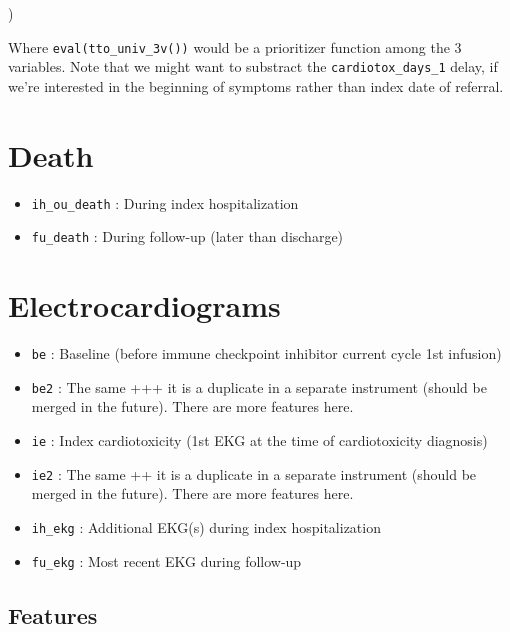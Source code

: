 \documentclass[
]{book}
\newenvironment{Shaded}{\begin{snugshade}}{\end{snugshade}}
\newcommand{\NormalTok}[1]{#1}
\begin{document}
\begin{Shaded}
\begin{Highlighting}[]
\NormalTok{  )}
\end{Highlighting}
\end{Shaded}

Where \texttt{eval(tto\_univ\_3v())} would be a prioritizer function among the 3 variables. Note that we might want to substract the \texttt{cardiotox\_days\_1} delay, if we're interested in the beginning of symptoms rather than index date of referral.

\hypertarget{death}{%
\section{Death}\label{death}}

\begin{itemize}
\item
  \texttt{ih\_ou\_death} : During index hospitalization
\item
  \texttt{fu\_death} : During follow-up (later than discharge)
\end{itemize}

\hypertarget{electrocardiograms}{%
\section{Electrocardiograms}\label{electrocardiograms}}

\begin{itemize}
\item
  \texttt{be} : Baseline (before immune checkpoint inhibitor current cycle 1st infusion)
\item
  \texttt{be2} : The same +++ it is a duplicate in a separate instrument (should be merged in the future). There are more features here.
\item
  \texttt{ie} : Index cardiotoxicity (1st EKG at the time of cardiotoxicity diagnosis)
\item
  \texttt{ie2} : The same ++ it is a duplicate in a separate instrument (should be merged in the future). There are more features here.
\item
  \texttt{ih\_ekg} : Additional EKG(s) during index hospitalization
\item
  \texttt{fu\_ekg} : Most recent EKG during follow-up
\end{itemize}

\hypertarget{features}{%
\subsection{Features}\label{features}}
\end{document}
